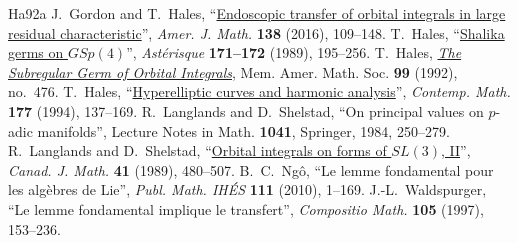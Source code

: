 \documentclass[11pt,letterpaper]{article}
\begin{document}
\begin{thebibliography}{Ha92a}
 J.~Gordon and T.~Hales, ``\href{https://muse.jhu.edu/article/609681/summary}{Endoscopic transfer of orbital integrals in large residual characteristic}'', \textit{Amer. J. Math.} \textbf{138} (2016), 109--148.
 T.~Hales, ``\href{https://www.numdam.org/article/AST_1989__171-172__195_0.pdf}{Shalika germs on $GSp(4)$}'', \textit{Ast\'erisque} \textbf{171--172} (1989), 195--256.
 T.~Hales, \href{https://iacobus.usc.gal/nde/fulldisplay/alma991013513907807712/34CISUG_USC:NDE/gl}{\textit{The Subregular Germ of Orbital Integrals}}, Mem. Amer. Math. Soc. \textbf{99} (1992), no.~476.
 T.~Hales, ``\href{https://publicationsthomashales.wordpress.com/wp-content/uploads/2016/03/hyperelliptic-curves-harmonic-analysis-scan.pdf}{Hyperelliptic curves and harmonic analysis}'', \textit{Contemp. Math.} \textbf{177} (1994), 137--169.
 R.~Langlands and D.~Shelstad, ``On principal values on $p$-adic manifolds'', Lecture Notes in Math. \textbf{1041}, Springer, 1984, 250--279.
 R.~Langlands and D.~Shelstad, ``\href{https://publications.ias.edu/sites/default/files/orbital-integrals-ii_rpl.pdf}{Orbital integrals on forms of $SL(3)$, II}'', \textit{Canad. J. Math.} \textbf{41} (1989), 480--507.
 B.~C.~Ng\^o, ``Le lemme fondamental pour les alg\`ebres de Lie'', \textit{Publ. Math. IH\'ES} \textbf{111} (2010), 1--169.
 J.-L.~Waldspurger, ``Le lemme fondamental implique le transfert'', \textit{Compositio Math.} \textbf{105} (1997), 153--236.
\end{thebibliography}
\end{document}
